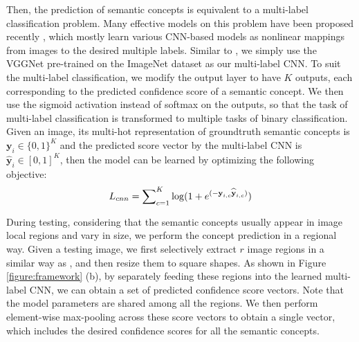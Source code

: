 \documentclass[10pt,twocolumn,letterpaper]{article}
\begin{document}
Then, the prediction of semantic concepts is
equivalent to a multi-label classification problem.
Many effective models on this problem have been proposed recently \cite{wei2014cnn,wu2016value,wang2016cnn,gong2013deep,wu2015deep},
which mostly learn various CNN-based models as nonlinear
mappings from images to the desired multiple labels.
Similar to \cite{wei2014cnn,wu2016value},
we simply use the VGGNet \cite{simonyan2014very} pre-trained
on the ImageNet dataset \cite{russakovsky2015imagenet}
as our multi-label CNN.
To suit the multi-label classification, we modify the output layer to have $K$ outputs,
each corresponding to the predicted confidence score of a semantic concept.
We then use the sigmoid activation instead of softmax on the outputs,
so that the task of multi-label classification is transformed to multiple tasks of binary classification.
Given an image, its multi-hot representation of
groundtruth semantic concepts is ${{\textbf{y}}_i} \in {\{0,1\}^{K}}$ and
the predicted score vector by the multi-label CNN is
${\widehat {\textbf{y}}_i} \in {[0,1]^{K}}$,
then the model can be learned by optimizing the following objective:
\begin{equation} \label{eqn:e2}
\setlength{\abovedisplayskip}{2pt}
\setlength{\belowdisplayskip}{5pt}
\begin{aligned}
L_{cnn} = {\sum\nolimits_{c = 1}^{K} {\log (1 + {e^{( - {\textbf{y}_{i,c}} {\widehat {\textbf{y}}_{i,c}})}})} }
\end{aligned}
\end{equation}





During testing, considering that the semantic concepts usually appear in
image local regions and vary in size, we perform the concept prediction
in a regional way.
Given a testing image, we first selectively extract $r$ image regions in a similar way
as \cite{wei2014cnn}, and then resize them to square shapes.
As shown in Figure \ref{figure:framework} (b),
by separately feeding these regions into the learned multi-label CNN,
we can obtain a set of predicted confidence score vectors.
Note that the model parameters are shared among all the regions.
We then perform element-wise max-pooling across these score vectors
to obtain a single vector, which includes the desired confidence scores for
all the semantic concepts.
\end{document}

